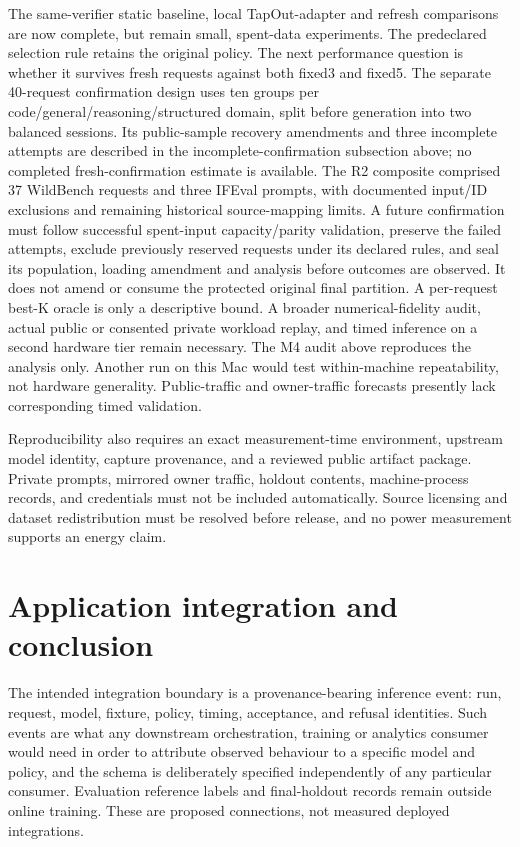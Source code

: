 \documentclass[
  11pt,
]{article}
\begin{document}
The same-verifier static baseline, local TapOut-adapter and refresh
comparisons are now complete, but remain small, spent-data experiments.
The predeclared selection rule retains the original policy. The next
performance question is whether it survives fresh requests against both
fixed3 and fixed5. The separate 40-request confirmation design uses ten
groups per code/general/reasoning/structured domain, split before
generation into two balanced sessions. Its public-sample recovery
amendments and three incomplete attempts are described in the
incomplete-confirmation subsection above; no completed
fresh-confirmation estimate is available. The R2 composite comprised 37
WildBench requests and three IFEval prompts, with documented input/ID
exclusions and remaining historical source-mapping limits. A future
confirmation must follow successful spent-input capacity/parity
validation, preserve the failed attempts, exclude previously reserved
requests under its declared rules, and seal its population, loading
amendment and analysis before outcomes are observed. It does not amend
or consume the protected original final partition. A per-request best-K
oracle is only a descriptive bound. A broader numerical-fidelity audit,
actual public or consented private workload replay, and timed inference
on a second hardware tier remain necessary. The M4 audit above
reproduces the analysis only. Another run on this Mac would test
within-machine repeatability, not hardware generality. Public-traffic
and owner-traffic forecasts presently lack corresponding timed
validation.

Reproducibility also requires an exact measurement-time environment,
upstream model identity, capture provenance, and a reviewed public
artifact package. Private prompts, mirrored owner traffic, holdout
contents, machine-process records, and credentials must not be included
automatically. Source licensing and dataset redistribution must be
resolved before release, and no power measurement supports an energy
claim.

\section{Application integration and
conclusion}\label{application-integration-and-conclusion}

The intended integration boundary is a provenance-bearing inference
event: run, request, model, fixture, policy, timing, acceptance, and
refusal identities. Such events are what any downstream orchestration,
training or analytics consumer would need in order to attribute observed
behaviour to a specific model and policy, and the schema is deliberately
specified independently of any particular consumer. Evaluation reference
labels and final-holdout records remain outside online training. These
are proposed connections, not measured deployed integrations.
\end{document}

